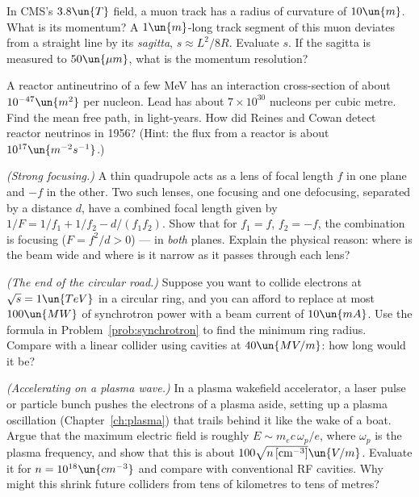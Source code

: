 \begin{problems}
 In CMS's $3.8\un{T}$ field, a muon track has a radius of curvature of $10\un{m}$. What is its momentum? A $1\un{m}$-long track segment of this muon deviates from a straight line by its \emph{sagitta}, $s\approx L^2/8R$. Evaluate $s$. If the sagitta is measured to $50\un{\mu m}$, what is the momentum resolution?

\core \label{prob:neutrino-mfp} A reactor antineutrino of a few MeV has an interaction cross-section of about $10^{-47}\un{m^2}$ per nucleon. Lead has about $7\times10^{30}$ nucleons per cubic metre. Find the mean free path, in light-years. How did Reines and Cowan detect reactor neutrinos in 1956? (Hint: the flux from a reactor is about $10^{17}\un{m^{-2}s^{-1}}$.)

\core \label{prob:strong-focusing} \emph{(Strong focusing.)} A thin quadrupole acts as a lens of focal length $f$ in one plane and $-f$ in the other. Two such lenses, one focusing and one defocusing, separated by a distance $d$, have a combined focal length given by $1/F = 1/f_1 + 1/f_2 - d/(f_1f_2)$. Show that for $f_1 = f$, $f_2 = -f$, the combination is focusing ($F = f^2/d>0$) --- in \emph{both} planes. Explain the physical reason: where is the beam wide and where is it narrow as it passes through each lens?

 \emph{(The end of the circular road.)} Suppose you want to collide electrons at $\sqrt s = 1\un{TeV}$ in a circular ring, and you can afford to replace at most $100\un{MW}$ of synchrotron power with a beam current of $10\un{mA}$. Use the formula in Problem~\ref{prob:synchrotron} to find the minimum ring radius. Compare with a linear collider using cavities at $40\un{MV/m}$: how long would it be?

 \emph{(Accelerating on a plasma wave.)} In a plasma wakefield accelerator, a laser pulse or particle bunch pushes the electrons of a plasma aside, setting up a plasma oscillation (Chapter~\ref{ch:plasma}) that trails behind it like the wake of a boat. Argue that the maximum electric field is roughly $E\sim m_ec\,\omega_p/e$, where $\omega_p$ is the plasma frequency, and show that this is about $100\sqrt{n\,[\mathrm{cm^{-3}}]}\un{V/m}$. Evaluate it for $n = 10^{18}\un{cm^{-3}}$ and compare with conventional RF cavities. Why might this shrink future colliders from tens of kilometres to tens of metres?
\end{problems}

\begin{reading}
\end{reading}
